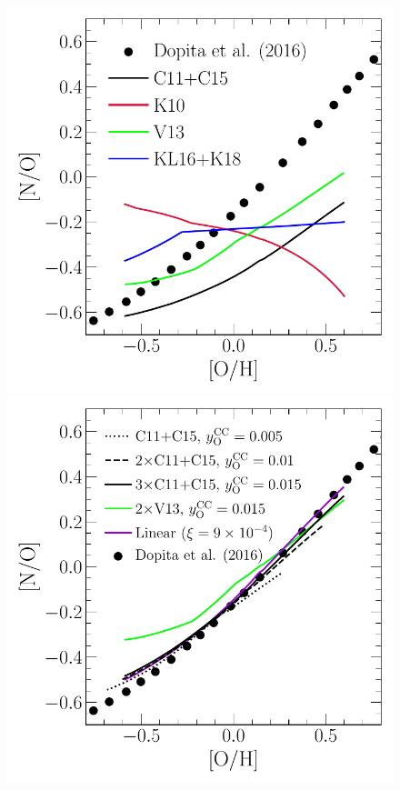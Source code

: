 \begin{figure}
\centering
\includegraphics[scale = 0.45]{no_oh_predictions_unmodified.pdf}
\includegraphics[scale = 0.45]{no_oh_predictions.pdf}

\end{figure}
